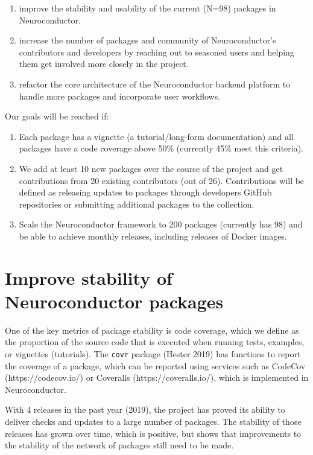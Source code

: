 \documentclass[]{elsarticle} %
\providecommand{\tightlist}{%
  \setlength{\itemsep}{0pt}\setlength{\parskip}{0pt}}
\begin{document}
\begin{enumerate}
\def\labelenumi{\arabic{enumi}.}
\tightlist
\item
  improve the stability and usability of the current (N=98) packages in
  Neuroconductor.
\item
  increase the number of packages and community of Neuroconductor's
  contributors and developers by reaching out to seasoned users and
  helping them get involved more closely in the project.
\item
  refactor the core architecture of the Neuroconductor backend platform
  to handle more packages and incorporate user workflows.
\end{enumerate}

Our goals will be reached if:

\begin{enumerate}
\def\labelenumi{\arabic{enumi}.}
\tightlist
\item
  Each package has a vignette (a tutorial/long-form documentation) and
  all packages have a code coverage above 50\% (currently 45\% meet this
  criteria).
\item
  We add at least 10 new packages over the course of the project and get
  contributions from 20 existing contributors (out of 26). Contributions
  will be defined as releasing updates to packages through developers
  GitHub repositories or submitting additional packages to the
  collection.
\item
  Scale the Neuroconductor framework to 200 packages (currently has 98)
  and be able to achieve monthly releases, including releases of Docker
  images.
\end{enumerate}

\section{Improve stability of Neuroconductor
packages}\label{improve-stability-of-neuroconductor-packages}

One of the key metrics of package stability is code coverage, which we
define as the proportion of the source code that is executed when
running tests, examples, or vignettes (tutorials). The \texttt{covr}
package (Hester 2019) has functions to report the coverage of a package,
which can be reported using services such as CodeCov
(https://codecov.io/) or Coveralls (https://coveralls.io/), which is
implemented in Neuroconductor.

With 4 releases in the past year (2019), the project has proved its
ability to deliver checks and updates to a large number of packages. The
stability of those releases has grown over time, which is positive, but
shows that improvements to the stability of the network of packages
still need to be made.
\end{document}
